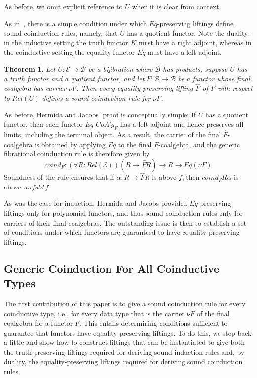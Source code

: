 \documentclass{LMCS}
\newcommand{\ra}{\rightarrow}
\newcommand\E{{\mathcal E}}
\newcommand\B{{\mathcal B}}
\newcommand\coalg{\mathit{CoAlg}}
\newcommand\dcoalg{\mbox{-}\!\coalg}
\theoremstyle{plain}
\newtheorem{theorem}{Theorem}[section]
\theoremstyle{remark}
\theoremstyle{definition}
\begin{document}
\noindent
As before, we omit explicit reference to $U$ when it is clear from context.

As in~\cite{hj98}, there is a simple condition under which
$Eq$-preserving liftings define sound coinduction rules, namely, that
$U$ has a quotient functor. Note the duality: in the inductive setting
the truth functor $K$ must have a right adjoint, whereas in the
coinductive setting the equality functor $Eq$ must have a left
adjoint.

\begin{theorem}\label{thm:coind}
  Let $U:\E \ra \B$ be a bifibration where $\B$ has products, suppose
  $U$ has a truth functor and a quotient functor, and let $F :\B \to
  \B$ be a functor whose final coalgebra has carrier $\nu F$. Then
  every equality-preserving lifting $\hat{F}$ of $F$ with respect to
  $Rel(U)$ defines a sound coinduction rule for $\nu F$.
\end{theorem}

As before, Hermida and Jacobs' proof is conceptually simple: If $U$
has a quotient functor, then each functor $Eq\dcoalg_F$ has a left
adjoint and hence preserves all limits, including the terminal
object. As a result, the carrier of the final $\hat{F}$-coalgebra is
obtained by applying $Eq$ to the final $F$-coalgebra, and the generic
fibrational coinduction rule is therefore given by
\[\mathit{coind}_F : (\forall R : Rel(\E)) (R \ra \hat{F} R) \ra R \ra
Eq (\nu F)\] 
\noindent
Soundness of the rule ensures that if $\alpha : R \ra \hat{F}R$ is
above $f$, then $\mathit{coind}_F R \alpha$ is above $\mathit{unfold}
\,f$.

As was the case for induction, Hermida and Jacobs provided
$Eq$-preserving liftings only for polynomial functors, and thus sound
coinduction rules only for carriers of their final coalgebras.  The
outstanding issue is then to establish a set of conditions under which
functors are guaranteed to have equality-preserving liftings.

\subsection{Generic Coinduction For All Coinductive Types}

The first contribution of this paper is to give a sound coinduction
rule for every coinductive type, i.e., for every data type that
is the carrier $\nu F$ of the final coalgebra for a functor $F$. This
entails determining conditions sufficient to guarantee that functors
have equality-preserving liftings.  To do this, we step back a little
and show how to construct liftings that can be instantiated to give
both the truth-preserving liftings required for deriving sound
induction rules and, by duality, the equality-preserving liftings
required for deriving sound coinduction rules.
\end{document}

